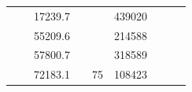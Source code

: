 \begin{table}[]
\begin{tabular}{|cclccllll}
\multicolumn{1}{|c|}{\cellcolor[HTML]{FFFFC7}}                                & \multicolumn{1}{c|}{\cellcolor[HTML]{DAE8FC}}                      & \multicolumn{1}{l|}{\cellcolor[HTML]{DDFDFF}17239.7}   & \multicolumn{1}{c|}{\cellcolor[HTML]{FFFFC7}}                                & \multicolumn{1}{c|}{\cellcolor[HTML]{DAE8FC}}                       & \multicolumn{1}{l|}{\cellcolor[HTML]{DAE8FC}439020}    &                                                                              &                                                                    &                                                        \\ \cline{3-3} \cline{6-6}
\multicolumn{1}{|c|}{\cellcolor[HTML]{FFFFC7}}                                & \multicolumn{1}{c|}{\cellcolor[HTML]{DAE8FC}}                      & \multicolumn{1}{l|}{\cellcolor[HTML]{DAE8FC}55209.6}   & \multicolumn{1}{c|}{\cellcolor[HTML]{FFFFC7}}                                & \multicolumn{1}{c|}{\cellcolor[HTML]{DAE8FC}}                       & \multicolumn{1}{l|}{\cellcolor[HTML]{DDFDFF}214588}    &                                                                              &                                                                    &                                                        \\ \cline{3-3} \cline{6-6}
\multicolumn{1}{|c|}{\cellcolor[HTML]{FFFFC7}}                                & \multicolumn{1}{c|}{\cellcolor[HTML]{DAE8FC}}                      & \multicolumn{1}{l|}{\cellcolor[HTML]{DDFDFF}57800.7}   & \multicolumn{1}{c|}{\cellcolor[HTML]{FFFFC7}}                                & \multicolumn{1}{c|}{\cellcolor[HTML]{DAE8FC}}                       & \multicolumn{1}{l|}{\cellcolor[HTML]{DAE8FC}318589}    &                                                                              &                                                                    &                                                        \\ \cline{3-3} \cline{6-6}
\multicolumn{1}{|c|}{\cellcolor[HTML]{FFFFC7}}                                & \multicolumn{1}{c|}{\cellcolor[HTML]{DAE8FC}}                      & \multicolumn{1}{l|}{\cellcolor[HTML]{DAE8FC}72183.1}   & \multicolumn{1}{c|}{\cellcolor[HTML]{FFFFC7}}                                & \multicolumn{1}{c|}{\multirow{-10}{*}{\cellcolor[HTML]{DAE8FC}75}}  & \multicolumn{1}{l|}{\cellcolor[HTML]{DDFDFF}108423}    &                                                                              &                                                                    &                                                        \\ \cline{3-3} \cline{5-6}

\end{tabular}
\end{table}
